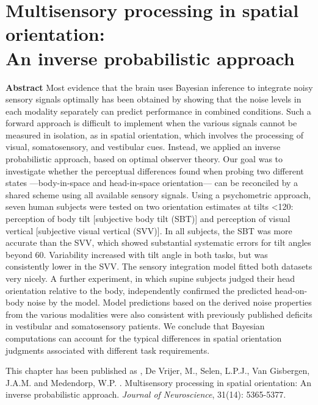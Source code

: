
\thispagestyle{empty}

\chapter{Multisensory processing in spatial orientation:\\An inverse probabilistic approach}
\chaptermark{}
\label{p1}

\newpage

\small {\bf Abstract} Most evidence that the brain uses Bayesian inference to integrate noisy sensory signals optimally has been obtained by showing that the noise levels in each modality separately can predict performance in combined conditions. Such a forward approach is difficult to implement when the various signals cannot be measured in isolation, as in spatial orientation, which involves the processing of visual, somatosensory, and vestibular cues. Instead, we applied an inverse probabilistic approach, based on optimal observer theory. Our goal was to investigate whether the perceptual differences found when probing two different states ---body-in-space and head-in-space orientation--- can be reconciled by a shared scheme using all available sensory signals. Using a psychometric approach, seven human subjects were tested on two orientation estimates at tilts \textless 120\textdegree: perception of body tilt [subjective body tilt (SBT)] and perception of visual vertical [subjective visual vertical (SVV)]. In all subjects, the SBT was more accurate than the SVV, which showed substantial systematic errors for tilt angles beyond 60\textdegree. Variability increased with tilt angle in both tasks, but was consistently lower in the SVV. The sensory integration model fitted both datasets very nicely. A further experiment, in which supine subjects judged their head orientation relative to the body, independently confirmed the predicted head-on-body noise by the model. Model predictions based on the derived noise properties from the various modalities were also consistent with previously published deficits in vestibular and somatosensory patients. We conclude that Bayesian computations can account for the typical differences in spatial orientation judgments associated with different task requirements.

\vfill

\noindent\underline{ \hspace{4cm} }

\noindent This chapter has been published as \newline
{}, De Vrijer, M., Selen, L.P.J., Van Gisbergen, J.A.M. and Medendorp, W.P. \citeyear{clemens2011}. Multisensory processing in spatial orientation: An inverse probabilistic approach. \emph{Journal of Neuroscience}, 31(14): 5365-5377. \newline

